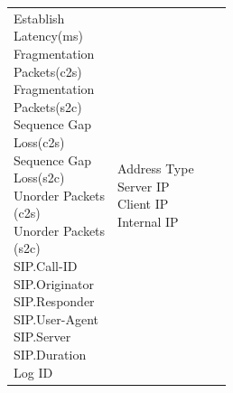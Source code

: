 \begin{description}
\begin{longtable}{p{}|p{}|p{}|p{}}
{                                                                            Establish\\ Latency(ms)\\
                                                                            Fragmentation\\ Packets(c2s)\\
                                                                            Fragmentation\\ Packets(s2c)\\
                                                                            Sequence Gap\\ Loss(c2s)\\
                                                                            Sequence Gap\\ Loss(s2c)\\
                                                                            Unorder Packets\\(c2s)\\
                                                                            Unorder Packets\\(s2c)\\
                                                                            SIP.Call-ID\\
                                                                            SIP.Originator\\
                                                                            SIP.Responder\\
                                                                            SIP.User-Agent\\
                                                                            SIP.Server\\
                                                                            SIP.Duration\\
                                                                            Log ID}  &  \tabincell{l}{Address Type\\
                                                                                                    Server IP\\
                                                                                                    Client IP\\
                                                                                                    Internal IP\\
}
\end{longtable}
\end{description}
